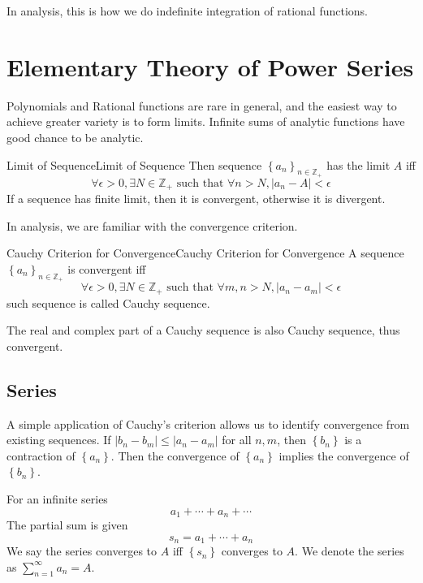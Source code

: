 \documentclass[../main.tex]{subfiles}
\begin{document}
In analysis, this is how we do indefinite integration of rational functions.

\section{Elementary Theory of Power Series}

Polynomials and Rational functions are rare in general, and the easiest way to achieve greater variety is to form limits. Infinite sums of analytic functions have good chance to be analytic.

\begin{definition}{Limit of Sequence}{Limit of Sequence}
Then sequence $\left\{ a_n \right\}_{n\in \mathbb{Z}_+}$ has the limit $A$ iff
\begin{equation*}
	\forall \epsilon>0, \exists N\in \mathbb{Z}_+ \text{ such that } \forall n>N, \left|a_n-A\right|<\epsilon
\end{equation*}
If a sequence has finite limit, then it is convergent, otherwise it is divergent.
\end{definition}

In analysis, we are familiar with the convergence criterion.

\begin{theorem}{Cauchy Criterion for Convergence}{Cauchy Criterion for Convergence}
	A sequence $\left\{ a_n \right\}_{n\in \mathbb{Z}_+}$ is convergent iff
\begin{equation*}
	\forall \epsilon>0, \exists N\in \mathbb{Z}_+ \text{ such that } \forall m,n>N, \left|a_n-a_m\right|<\epsilon
\end{equation*}
such sequence is called Cauchy sequence.
\end{theorem}
The real and complex part of a Cauchy sequence is also Cauchy sequence, thus convergent.

\subsection{Series}
A simple application of Cauchy's criterion allows us to identify convergence from existing sequences. If $|b_n-b_m| \leq |a_n-a_m|$ for all $n,m$, then $\left\{ b_n \right\}$ is a contraction of $\left\{ a_n \right\}$. Then the convergence of $\left\{ a_n \right\}$ implies the convergence of $\left\{ b_n \right\}$.

For an infinite series
\begin{equation}
a_1 + \cdots + a_n + \cdots
\end{equation}
The partial sum is given
\begin{equation*}
s_n = a_1 + \cdots + a_n
\end{equation*}
We say the series converges to $A$ iff $\left\{ s_n \right\}$ converges to $A$. We denote the series as $\sum_{n=1}^{\infty } a_n = A$.
\end{document}
